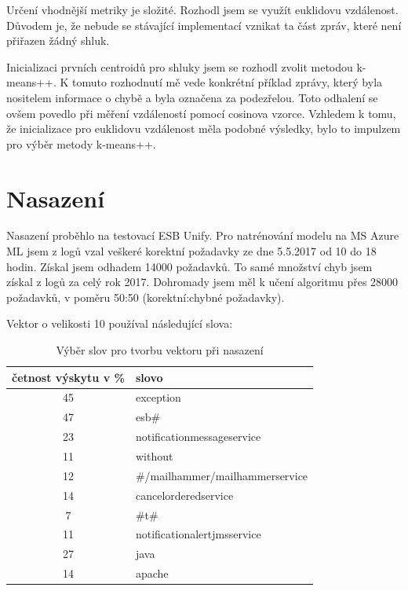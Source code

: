 \documentclass[thesis=M,czech]{FITthesis}[2012/10/20]
\begin{document}
			Určení vhodnější metriky je složité. Rozhodl jsem se využít euklidovu vzdálenost. Důvodem je, že nebude se stávající implementací vznikat ta část zpráv, které není přiřazen žádný shluk.
			
			Inicializaci prvních centroidů pro shluky jsem se rozhodl zvolit metodou k-means++. K tomuto rozhodnutí mě vede konkrétní příklad  zprávy, který byla nositelem informace o chybě a byla označena za podezřelou. Toto odhalení se ovšem povedlo při měření vzdáleností pomocí cosinova vzorce. Vzhledem k tomu, že inicializace pro euklidovu vzdálenost měla podobné výsledky, bylo to impulzem pro výběr metody k-means++.
			
		\section{Nasazení}
			Nasazení proběhlo na testovací ESB Unify. Pro natrénování modelu na MS Azure ML jsem z logů vzal veškeré korektní požadavky ze dne 5.5.2017 od 10 do 18 hodin. Získal jsem odhadem 14000 požadavků. To samé množství chyb jsem získal z logů za celý rok 2017. Dohromady jsem měl k učení algoritmu přes 28000 požadavků, v poměru 50:50 (korektní:chybné požadavky).
			
			Vektor o velikosti 10 používal následující slova:
			
			\begin{table}[htb]\centering
				\centering
				\caption{Výběr slov pro tvorbu vektoru při nasazení}
				\label{tab:vector-real}
				\begin{tabular}{|c|l|}
					\hline
					\textbf{četnost výskytu v \%} & \textbf{slovo} \\ \hline
					45                            & exception   \\ \hline
					47                            & esb\#   \\ \hline
					23                            & notificationmessageservice     \\ \hline
					11                            & without     \\ \hline
					12                            & \#/mailhammer/mailhammerservice     \\ \hline
					14                            & cancelorderedservice     \\ \hline
					7                            & \#t\# \\ \hline
					11                            & notificationalertjmsservice  \\ \hline
					27                            & java   \\ \hline
					14                           & apache \\ \hline
				\end{tabular}
			\end{table}
			
\end{document}
